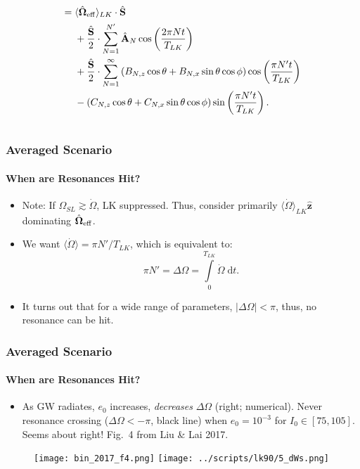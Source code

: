 \documentclass[dvipsnames, 8pt]{beamer}
\newcommand*{\bm}[1]{\boldsymbol{\mathbf{#1}}}
\newcommand*{\uv}[1]{\hat{\bm{#1}}}
\newcommand*{\abs}[1]{\left|#1\right|}
\newcommand*{\ev}[1]{\langle#1\rangle}
\newcommand*{\p}[1]{\left(#1\right)}
\begin{document}
\begin{frame}
\begin{columns}
\begin{column}{0.5\textwidth}
\begin{align}
                    ={}& \ev{\uv{\Omega}_{\rm eff}}_{LK}
                        \cdot \uv{S}\nonumber\\
                    &+\frac{\uv{S}}{2} \cdot \sum\limits_{N = 1}^{N'} \uv{A}_N
                        \cos \p{\frac{2\pi N t}{T_{LK}}}\nonumber\\
                    &+ \frac{\uv{S}}{2} \cdot \sum\limits_{N = 1}^\infty
                        \p{B_{N,z} \cos\theta + B_{N,x}\sin\theta\cos \phi}
                            \cos\p{\frac{\pi N' t}{T_{LK}}}\nonumber\\
                    &- \p{C_{N,z}\cos\theta + C_{N,x}\sin\theta \cos \phi }
                        \sin \p{\frac{\pi N' t}{T_{LK}}}.
            \end{align}
        \end{column}
    \end{columns}
\end{frame}
\begin{frame}
    \frametitle{Averaged Scenario}
    \framesubtitle{When are Resonances Hit?}
    \begin{itemize}
        \item Note: If $\Omega_{SL} \gtrsim \dot{\Omega}$, LK
            suppressed. Thus, consider primarily
            $\ev{\dot{\Omega}}_{LK}\uv{z}$ dominating $\uv{\Omega}_{\rm eff}$.

        \item We want $\ev{\dot{\Omega}} = \pi N'/T_{LK}$, which is
            equivalent to:
            \begin{equation}
                \pi N' = \Delta \Omega = \int\limits_0^{T_{LK}}
                    \dot{\Omega}\;\mathrm{d}t.
            \end{equation}

        \item It turns out that for a wide range of parameters,
            $\abs{\Delta \Omega} < \pi$, thus, no resonance can be hit.
    \end{itemize}
\end{frame}

\begin{frame}
    \frametitle{Averaged Scenario}
    \framesubtitle{When are Resonances Hit?}

    \begin{itemize}
        \item As GW radiates, $e_0$ increases, \emph{decreases} $\Delta
            \Omega$ (right; numerical). Never resonance crossing ($\Delta \Omega
            < -\pi$, black line) when $e_0 = 10^{-3}$ for $I_0 \in [75, 105]$.
            Seems about right! Fig.~4 from Liu \& Lai 2017.
    \end{itemize}

    \begin{figure}[h]
        \centering
        \texttt{[image: bin\_2017\_f4.png]}
        \texttt{[image: ../scripts/lk90/5\_dWs.png]}
    \end{figure}
\end{frame}
\end{document}
